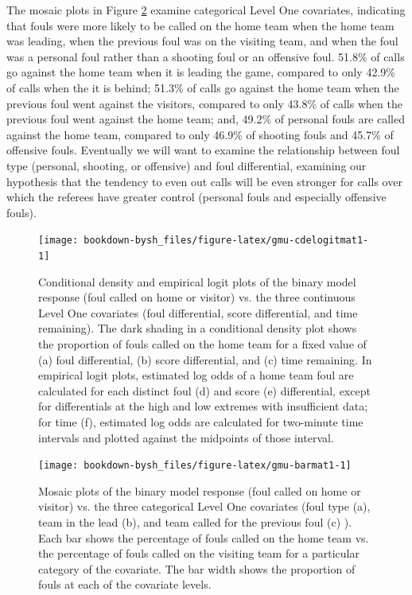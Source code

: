 \documentclass[
]{krantz}
\begin{document}
The mosaic plots in Figure \ref{fig:gmu-barmat1} examine categorical Level One covariates, indicating that fouls were more likely to be called on the home team when the home team was leading, when the previous foul was on the visiting team, and when the foul was a personal foul rather than a shooting foul or an offensive foul. 51.8\% of calls go against the home team when it is leading the game, compared to only 42.9\% of calls when the it is behind; 51.3\% of calls go against the home team when the previous foul went against the visitors, compared to only 43.8\% of calls when the previous foul went against the home team; and, 49.2\% of personal fouls are called against the home team, compared to only 46.9\% of shooting fouls and 45.7\% of offensive fouls. Eventually we will want to examine the relationship between foul type (personal, shooting, or offensive) and foul differential, examining our hypothesis that the tendency to even out calls will be even stronger for calls over which the referees have greater control (personal fouls and especially offensive fouls).

\begin{figure}

{\centering \texttt{[image: bookdown-bysh\_files/figure-latex/gmu-cdelogitmat1-1]} 

}

\caption{Conditional density and empirical logit plots of the binary model response (foul called on home or visitor) vs. the three continuous Level One covariates (foul differential, score differential, and time remaining).  The dark shading in a conditional density plot shows the proportion of fouls called on the home team for a fixed value of (a) foul differential, (b) score differential, and (c) time remaining.  In empirical logit plots, estimated log odds of a home team foul are calculated for each distinct foul (d) and score (e) differential, except for differentials at the high and low extremes with insufficient data; for time (f), estimated log odds are calculated for two-minute time intervals and plotted against the midpoints of those interval.}\label{fig:gmu-cdelogitmat1}
\end{figure}

\begin{figure}

{\centering \texttt{[image: bookdown-bysh\_files/figure-latex/gmu-barmat1-1]} 

}

\caption{Mosaic plots of the binary model response (foul called on home or visitor) vs. the three categorical Level One covariates (foul type (a), team in the lead (b), and team called for the previous foul (c) ).  Each bar shows the percentage of fouls called on the home team vs. the percentage of fouls called on the visiting team for a particular category of the covariate.  The bar width shows the proportion of fouls at each of the covariate levels.}\label{fig:gmu-barmat1}
\end{figure}
\end{document}
